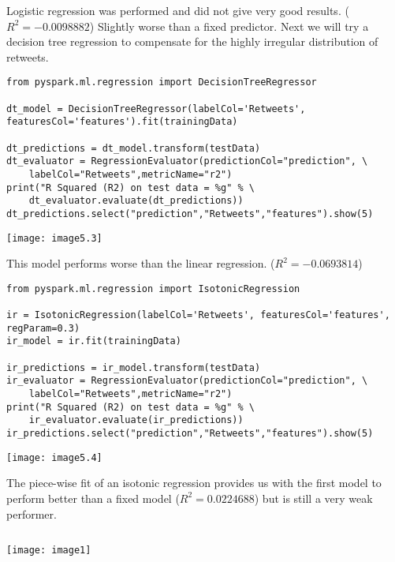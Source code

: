 \documentclass[]{article}
\begin{document}
Logistic regression was performed and did not give very good results. 
($R^2 = -0.0098882$)
Slightly worse than a fixed predictor. 
Next we will try a decision tree regression to compensate for the highly irregular distribution of retweets.

\begin{verbatim}
from pyspark.ml.regression import DecisionTreeRegressor

dt_model = DecisionTreeRegressor(labelCol='Retweets', featuresCol='features').fit(trainingData)

dt_predictions = dt_model.transform(testData)
dt_evaluator = RegressionEvaluator(predictionCol="prediction", \
	labelCol="Retweets",metricName="r2")
print("R Squared (R2) on test data = %g" % \
	dt_evaluator.evaluate(dt_predictions))
dt_predictions.select("prediction","Retweets","features").show(5)
\end{verbatim}
\texttt{[image: image5.3]} %

This model performs worse than the linear regression.
($R^2 = -0.0693814$)


\begin{verbatim}
from pyspark.ml.regression import IsotonicRegression

ir = IsotonicRegression(labelCol='Retweets', featuresCol='features', regParam=0.3)
ir_model = ir.fit(trainingData)

ir_predictions = ir_model.transform(testData)
ir_evaluator = RegressionEvaluator(predictionCol="prediction", \
	labelCol="Retweets",metricName="r2")
print("R Squared (R2) on test data = %g" % \
	ir_evaluator.evaluate(ir_predictions))
ir_predictions.select("prediction","Retweets","features").show(5)
\end{verbatim}
\texttt{[image: image5.4]} %

The piece-wise fit of an isotonic regression provides 
us with the first model to perform better than a fixed model 
($R^2 = 0.0224688$)
but is still a very weak performer.


\begin{verbatim}

\end{verbatim}
\texttt{[image: image1]} %
\end{document}
